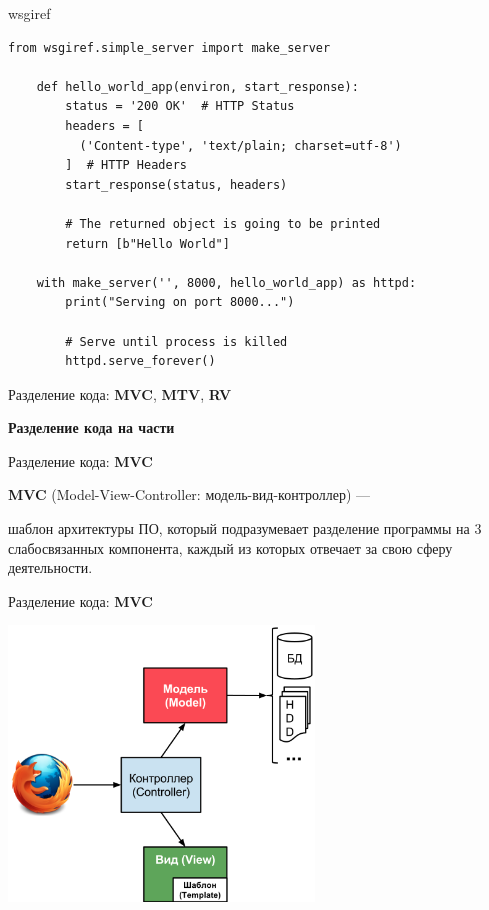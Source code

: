 \begin{frame}[fragile]{wsgiref}

    \begin{lstlisting}[style=python]
    from wsgiref.simple_server import make_server

    def hello_world_app(environ, start_response):
        status = '200 OK'  # HTTP Status
        headers = [
          ('Content-type', 'text/plain; charset=utf-8')
        ]  # HTTP Headers
        start_response(status, headers)

        # The returned object is going to be printed
        return [b"Hello World"]

    with make_server('', 8000, hello_world_app) as httpd:
        print("Serving on port 8000...")

        # Serve until process is killed
        httpd.serve_forever()
    \end{lstlisting}

\end{frame}


\begin{frame}{Разделение кода: \textbf{MVC}, \textbf{MTV}, \textbf{RV}}

  \textbf{Разделение кода на части}

\end{frame}


\begin{frame}{Разделение кода: \textbf{MVC}}

  \textbf{MVC} (Model-View-Controller: модель-вид-контроллер) —

  шаблон архитектуры ПО, который подразумевает разделение программы на 3
  слабосвязанных компонента, каждый из которых отвечает за свою сферу
  деятельности.

\end{frame}


\begin{frame}{Разделение кода: \textbf{MVC}}

  \begin{center}
    \includegraphics[width=3.2in]{media/mvc.png}
  \end{center}

\end{frame}


